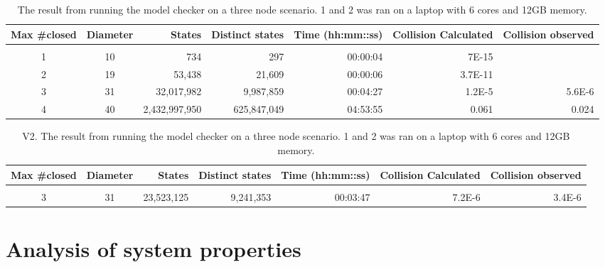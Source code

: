 
\begin{table}[h!]
    \label{table:no_malicious_builders}
    \begin{tabular}{c c r r r r r}
        Max \#closed & Diameter & States        & Distinct states & Time (hh:mm::ss) & Collision Calculated & Collision observed \\
        \hline                                                                                                                   \\
        1            & 10       & 734           & 297             & 00:00:04         & 7E-15                &                    \\
        2            & 19       & 53,438        & 21,609          & 00:00:06         & 3.7E-11              &                    \\
        3            & 31       & 32,017,982    & 9,987,859       & 00:04:27         & 1.2E-5               & 5.6E-6             \\
        4            & 40       & 2,432,997,950 & 625,847,049     & 04:53:55         & 0.061                & 0.024              \\
    \end{tabular}
    \caption[Three node model check]{The result from running the model checker on a three node scenario. 1 and 2 was ran on a laptop with 6 cores and 12GB memory.}
\end{table}

\begin{table}[h!]
    \label{table:one_malicious_builder}
    \begin{tabular}{c c r r r r r}
        Max \#closed & Diameter & States     & Distinct states & Time (hh:mm::ss) & Collision Calculated & Collision observed \\
        \hline                                                                                                                \\
        3            & 31       & 23,523,125 & 9,241,353       & 00:03:47         & 7.2E-6               & 3.4E-6             \\
    \end{tabular}
    \caption[Three node model check]{V2. The result from running the model checker on a three node scenario. 1 and 2 was ran on a laptop with 6 cores and 12GB memory.}
\end{table}

\section{Analysis of system properties}

